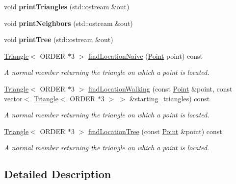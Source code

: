 \begin{DoxyCompactItemize}
\item 
\hypertarget{classMeshHandler_ac5ae61012c5cc086466dbe4fde83a462}{
void {\bfseries printTriangles} (std::ostream \&out)}
\label{classMeshHandler_ac5ae61012c5cc086466dbe4fde83a462}

\item 
\hypertarget{classMeshHandler_a71dafca65a78ef928eddafec0046013c}{
void {\bfseries printNeighbors} (std::ostream \&out)}
\label{classMeshHandler_a71dafca65a78ef928eddafec0046013c}

\item 
\hypertarget{classMeshHandler_a236dcbdcaed7cde080bc1ef9da80dc9b}{
void {\bfseries printTree} (std::ostream \&out)}
\label{classMeshHandler_a236dcbdcaed7cde080bc1ef9da80dc9b}

\item 
\hyperlink{classTriangle}{Triangle}$<$ ORDER $\ast$3 $>$ \hyperlink{classMeshHandler_ac101637668e7960b5ed960bb0d55a1af}{findLocationNaive} (\hyperlink{classPoint}{Point} point) const 
\begin{DoxyCompactList}\small\item\em A normal member returning the triangle on which a point is located. \item\end{DoxyCompactList}\item 
\hyperlink{classTriangle}{Triangle}$<$ ORDER $\ast$3 $>$ \hyperlink{classMeshHandler_a0d4dfa615986d926bfff90432aee863b}{findLocationWalking} (const \hyperlink{classPoint}{Point} \&point, const vector$<$ \hyperlink{classTriangle}{Triangle}$<$ ORDER $\ast$3 $>$ $>$ \&starting\_\-triangles) const 
\begin{DoxyCompactList}\small\item\em A normal member returning the triangle on which a point is located. \item\end{DoxyCompactList}\item 
\hyperlink{classTriangle}{Triangle}$<$ ORDER $\ast$3 $>$ \hyperlink{classMeshHandler_a2ebf0f4f46e7e74089ce40196d3ed596}{findLocationTree} (const \hyperlink{classPoint}{Point} \&point) const 
\begin{DoxyCompactList}\small\item\em A normal member returning the triangle on which a point is located. \item\end{DoxyCompactList}\end{DoxyCompactItemize}


\subsection{Detailed Description}
